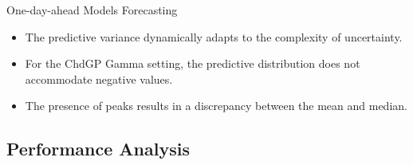 \begin{frame}{One-day-ahead Models Forecasting}
	\centering
	\begin{figure}[htbp]
		\centering
		\tiny
		\setlength{} 
		\setlength{}
		
		
	\end{figure}
	\vspace{-1.5em}
\begin{itemize}
	\item The predictive variance dynamically adapts to the complexity of uncertainty.
	\item For the ChdGP Gamma setting, the predictive distribution does not accommodate negative values.
	\item The presence of peaks results in a discrepancy between the mean and median.
\end{itemize}

\end{frame}

%		

\subsection{Performance Analysis}

%		

